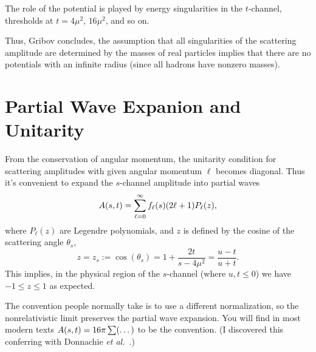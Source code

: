  The role of the potential is played by energy
singularities in the $t$-channel, thresholds at $t=4\mu^{2}$,
$16\mu^{2}$, and so on.

\M[-1]
Thus, Gribov concludes, the assumption that all singularities of the
scattering amplitude are determined by the masses of real particles
implies that there are no potentials with an infinite radius (since all
hadrons have nonzero masses).

\section{Partial Wave Expanion and Unitarity}

From the conservation of angular momentum, the unitarity condition for
scattering amplitudes with given angular momentum $\ell$ becomes
diagonal. Thus it's convenient to expand the $s$-channel amplitude into
partial waves
\begin{equation}
A(s,t) = \sum^{\infty}_{\ell=0}f_{\ell}(s)(2\ell+1)P_{\ell}(z),
\end{equation}
where $P_{\ell}(z)$ are Legendre polynomials, and $z$ is defined by the
cosine of the scattering angle $\theta_{s}$,
\begin{equation}\label{eq:introduction:z-of-s}
z = z_{s} := \cos(\theta_{s}) = 1 + \frac{2t}{s-4\mu^{2}}=\frac{u-t}{u+t}.
\end{equation}
This implies, in the physical region of the $s$-channel (where
$u,t\leq0$) we have $-1\leq z\leq 1$ as expected.

The convention people normally take is to use a different normalization,
so the nonrelativistic limit preserves the partial wave expansion. You
will find in most modern texts $A(s,t)=16\pi\sum(\dots)$ to be
the convention. (I discovered this conferring with Donnachie \textit{et al.}~\cite{Donnachie:2002en}.)

